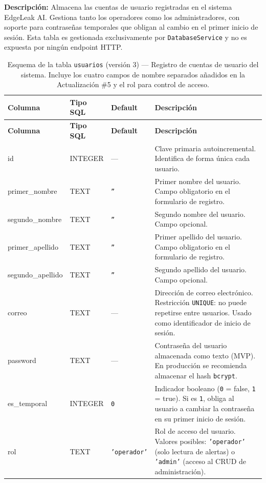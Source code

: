 \documentclass[12pt,a4paper]{article}
\begin{document}
\begin{mdframed}[linecolor=primaryblue,linewidth=1pt,backgroundcolor=blue!3]
\textbf{Descripción:} Almacena las cuentas de usuario registradas en el sistema EdgeLeak AI.
Gestiona tanto los operadores como los administradores, con soporte para contraseñas
temporales que obligan al cambio en el primer inicio de sesión. Esta tabla es gestionada
exclusivamente por \texttt{DatabaseService} y no es expuesta por ningún endpoint HTTP.
\end{mdframed}

\vspace{0.5em}

\begin{longtable}{>{\ttfamily}p{3.5cm} p{2cm} p{2cm} p{5.5cm}}
\caption{Esquema de la tabla \texttt{usuarios} (versión 3) --- Registro de cuentas de
  usuario del sistema. Incluye los cuatro campos de nombre separados añadidos en la
  Actualización \#5 y el rol para control de acceso.}
\label{tab:tabla-usuarios} \\
\toprule
\textbf{Columna} & \textbf{Tipo SQL} & \textbf{Default} & \textbf{Descripción} \\
\midrule
\endfirsthead
\toprule
\textbf{Columna} & \textbf{Tipo SQL} & \textbf{Default} & \textbf{Descripción} \\
\midrule
\endhead
\bottomrule
\endlastfoot
id & INTEGER & --- &
  Clave primaria autoincremental. Identifica de forma única cada usuario. \\[0.5em]
primer\_nombre & TEXT & \texttt{''} &
  Primer nombre del usuario. Campo obligatorio en el formulario de registro. \\[0.5em]
segundo\_nombre & TEXT & \texttt{''} &
  Segundo nombre del usuario. Campo opcional. \\[0.5em]
primer\_apellido & TEXT & \texttt{''} &
  Primer apellido del usuario. Campo obligatorio en el formulario de registro. \\[0.5em]
segundo\_apellido & TEXT & \texttt{''} &
  Segundo apellido del usuario. Campo opcional. \\[0.5em]
correo & TEXT & --- &
  Dirección de correo electrónico. Restricción \texttt{UNIQUE}: no puede repetirse
  entre usuarios. Usado como identificador de inicio de sesión. \\[0.5em]
password & TEXT & --- &
  Contraseña del usuario almacenada como texto (MVP). En producción se recomienda
  almacenar el hash \texttt{bcrypt}. \\[0.5em]
es\_temporal & INTEGER & \texttt{0} &
  Indicador booleano (\texttt{0} = false, \texttt{1} = true). Si es \texttt{1},
  obliga al usuario a cambiar la contraseña en su primer inicio de sesión. \\[0.5em]
rol & TEXT & \texttt{'operador'} &
  Rol de acceso del usuario. Valores posibles: \texttt{'operador'} (solo lectura
  de alertas) o \texttt{'admin'} (acceso al CRUD de administración). \\
\end{longtable}
\end{document}
